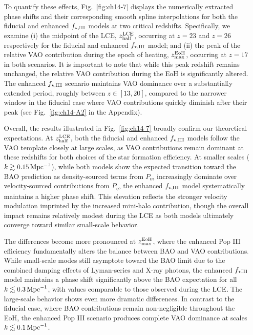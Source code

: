 To quantify these effects, Fig.~\ref{fig:ch14-7} displays the numerically extracted phase shifts and their corresponding smooth spline interpolations for both the fiducial and enhanced $f_{\star,\rm III}$ models at two critical redshifts.  Specifically, we examine (i) the midpoint of the LCE, $z_{\rm half}^{\rm LCE}$, occurring at $z=23$ and $z=26$ respectively for the fiducial and enhanced $f_{\star,\rm III}$ model; and (ii) the peak of the relative VAO contribution during the epoch of heating, $z_{\rm max}^{\rm EoH}$, occurring at $z=17$ in both scenarios. It is important to note that while this peak redshift remains unchanged, the relative VAO contribution during the EoH is significantly altered. The enhanced $f_{\star,\rm III}$ scenario maintains VAO dominance over a substantially extended period, roughly between $z\in[13,20]$, compared to the narrower window in the fiducial case where VAO contributions quickly diminish after their peak (see Fig.~\ref{fig:ch14-A2} in the Appendix).

Overall, the results illustrated in Fig.~\ref{fig:ch14-7} broadly confirm our theoretical expectations. At $z_{\rm half}^{\rm LCE}$, both the fiducial and enhanced $f_{\star,\rm III}$ models follow the VAO template closely at large scales, as VAO contributions remain dominant at these redshifts for both choices of the star formation efficiency. At smaller scales ($k \gtrsim 0.15\,\rm{Mpc}^{-1}$), while both models show the expected transition toward the BAO prediction as density-sourced terms from $P_m$ increasingly dominate over velocity-sourced contributions from $P_\eta$, the enhanced $f_{\star,\rm III}$ model systematically maintains  a higher phase shift. This elevation reflects the stronger velocity modulation imprinted by the increased mini-halo contribution, though the overall impact remains relatively modest during the LCE as both models ultimately converge toward similar small-scale behavior.

The differences become more pronounced at $z_{\rm max}^{\rm EoH}$, where the enhanced Pop III efficiency fundamentally alters the balance between BAO and VAO contributions. While small-scale modes still asymptote toward the BAO limit due to the combined damping effects of Lyman-series and X-ray photons, the enhanced $f_{\star \rm III}$ model maintains a phase shift significantly above the BAO expectation for all $k \lesssim 0.3\,\rm{Mpc}^{-1}$, with values comparable to those observed during the LCE. The large-scale behavior shows even more dramatic differences. In contrast to the fiducial case, where BAO contributions remain non-negligible throughout the EoH, the enhanced Pop III scenario produces complete VAO dominance at scales $k \lesssim 0.1\,\rm{Mpc}^{-1}$.

